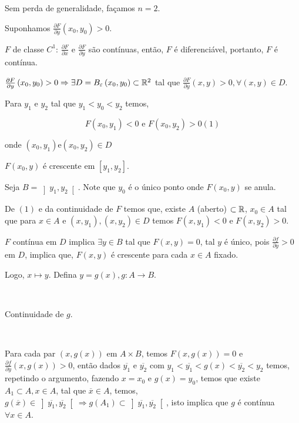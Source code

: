 \documentclass{book}
\begin{document}
\begin{dem}
Sem perda de generalidade, fa\c camos $n = 2$.

Suponhamos $\frac{{\partial F}}{{\partial y}}\left( {x_0 ,y_0 } \right) > 0$.

    $F$ de classe $C^1$: $\frac{{\partial F}}{{\partial x}}$ e $\frac{{\partial F}}{{\partial y}}$ s\~ao cont\'inuas, ent\~ao, $F$ \'e diferenci\'avel, portanto, $F$ \'e cont\'inua.

$\frac{{\partial F}}
{{\partial y}}\left( {x_0 ,y_0 } \right) > 0 \Rightarrow \exists D = B_\varepsilon  \left( {x_0 ,y_0 } \right) \subset \mathbb{R}^2$ tal que $\frac{{\partial F}}
{{\partial y}}\left( {x,y} \right) > 0,\forall \left( {x,y} \right) \in D$.

Para $y_1$ e $y_2$ tal que $y_1 < y_0 < y_2$ temos,

\[
F\left( {x_0 ,y_1 } \right) < 0{\text{ e }}F\left( {x_0 ,y_2 } \right) > 0\left( 1 \right)
\]

onde $\left( {x_0 ,y_1 } \right){\text{e}}\left( {x_0 ,y_2 } \right) \in D$

$F\left( {x_0 ,y} \right)$ \'e crescente em $\left[ {y_1 ,y_2 } \right]$.

Seja $B = \left] {y_1 ,y_2 } \right[$. Note que $y_0$ \'e o \'unico ponto onde $F\left( {x_0 ,y} \right)$ se anula.

De $(1)$ e da continuidade de $F$ temos que, existe $A$ (aberto) $\subset \mathbb{R}$, $x_0 \in A$ tal que para $x \in A$ e $\left( {x,y_1 } \right),\left( {x,y_2 } \right) \in D$ temos $F\left( {x,y_1 } \right) < 0$ e $F\left( {x,y_2 } \right) > 0$.

$F$ cont\'inua em $D$ implica $\exists y \in B$ tal que $F\left( {x,y} \right) = 0$, tal $y$ \'e \'unico, pois $\frac{{\partial f}}
{{\partial y}} > 0$ em $D$, implica que, $F\left( {x,y} \right)$ \'e crescente para cada $x \in A$ fixado.

Logo, $x \mapsto y$. Defina $y = g\left( x \right),g:A \to B$.

\

Continuidade de $g$.

\

Para cada par $\left( {x,g\left( x \right)} \right)$ em $A \times B$, temos $F\left( {x,g\left( x \right)} \right) = 0$ e $\frac{{\partial f}}
{{\partial y}}\left( {x,g\left( x \right)} \right) > 0$, ent\~ao dados $\overline {y_1}$ e $\overline {y_2}$ com $y_1  < \overline {y_1 }  < g\left( x \right) < \overline {y_2 }  < y_2$ temos, repetindo o argumento, fazendo $x = x_0$ e $g(x) = y_0$, temos que existe $A_1 \subset A, x \in A$, tal que $\overline x  \in A$, temos, $g\left( {\overline x } \right) \in \left] {\overline {y_1 } ,\overline {y_2 } } \right[ \Rightarrow g\left( {A_1 } \right) \subset \left] {\overline {y_1 } ,\overline {y_2 } } \right[$, isto implica que $g$ \'e cont\'inua $\forall x \in A$.


\end{dem}
\end{document}
